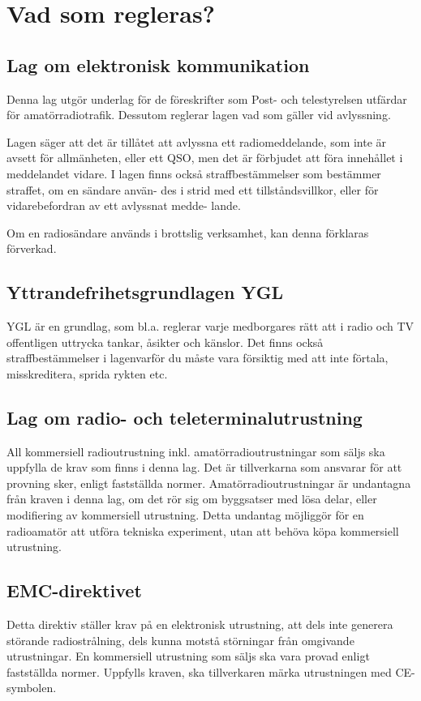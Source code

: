 \section{Vad som regleras?}

\subsection{Lag om elektronisk kommunikation}

Denna lag utgör underlag för de föreskrifter som Post- och telestyrelsen utfärdar för
amatörradiotrafik. Dessutom reglerar lagen vad som gäller vid avlyssning.

Lagen säger att det är tillåtet att avlyssna
ett radiomeddelande, som inte är avsett för
allmänheten, eller ett QSO, men det är förbjudet att föra innehållet i meddelandet vidare.
I lagen finns också straffbestämmelser som bestämmer straffet, om en sändare använ-
des i strid med ett tillståndsvillkor, eller för vidarebefordran av ett avlyssnat medde-
lande.

Om en radiosändare används i brottslig verksamhet, kan denna förklaras förverkad.

\subsection{Yttrandefrihetsgrundlagen YGL}

YGL är en grundlag, som bl.a. reglerar varje
medborgares rätt att i radio och TV offentligen uttrycka tankar, åsikter och känslor.
Det finns också straffbestämmelser i lagenvarför du måste vara försiktig med att inte
förtala, misskreditera, sprida rykten etc.

\subsection{Lag om radio- och teleterminalutrustning}

All kommersiell radioutrustning inkl.
amatörradioutrustningar som säljs ska uppfylla de krav som finns i denna lag.
Det är tillverkarna som ansvarar för att provning sker, enligt fastställda normer.
Amatörradioutrustningar är undantagna från kraven i denna lag, om det rör sig om
byggsatser med lösa delar, eller modifiering av kommersiell utrustning. Detta undantag
möjliggör för en radioamatör att utföra tekniska experiment, utan att behöva köpa
kommersiell utrustning.

\subsection{EMC-direktivet}
Detta direktiv ställer krav på en elektronisk utrustning, att dels inte generera störande radiostrålning, dels kunna motstå störningar från omgivande utrustningar. En kommersiell utrustning som säljs ska vara provad enligt fastställda normer. Uppfylls kraven, ska tillverkaren märka utrustningen med CE-symbolen.

